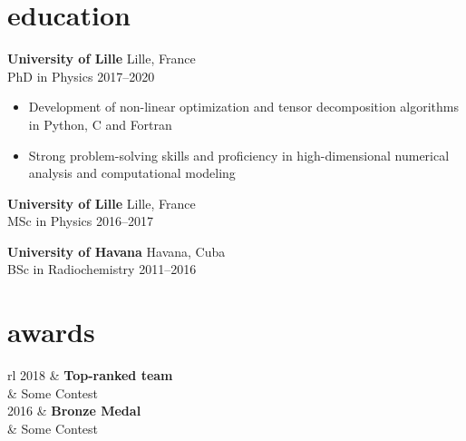 \documentclass[12pt]{article}
\newcommand{\entry}[4]{{{\textbf{#1}}} \hfill #3 \\ #2 \hfill #4}
\newcommand{\tableentry}[3]{\textsc{#1} & #2\expandafter\ifstrequal\expandafter{#3}{}{\\}{\\[6pt]}}
\begin{document}
\begin{paracol}{2}
    \bigskip

    \switchcolumn*

    \section{education}

    \entry{University of Lille}{PhD in Physics}{Lille, France}{2017--2020}
    \begin{itemize}[noitemsep,leftmargin=3.5mm,rightmargin=0mm,topsep=6pt]
    \item Development of non-linear optimization and tensor decomposition algorithms
      in Python, C and Fortran
      
    \item Strong problem-solving skills and proficiency in high-dimensional
      numerical analysis and computational modeling
    \end{itemize}

    \entry{University of Lille}{MSc in Physics}{Lille, France}{2016--2017}

    \entry{University of Havana}{BSc in Radiochemistry}{Havana, Cuba}{2011--2016}

    \switchcolumn{}


    \section{awards}
    \begin{supertabular}{rl}
      \tableentry{2018}{\textbf{Top-ranked team}}{}
      \tableentry{}{Some Contest}{spaceafter}
      \tableentry{2016}{\textbf{Bronze Medal}}{}
      \tableentry{}{Some Contest}{spaceafter}
    \end{supertabular}

  \end{paracol}

  \vspace*{\fill}
\end{document}
